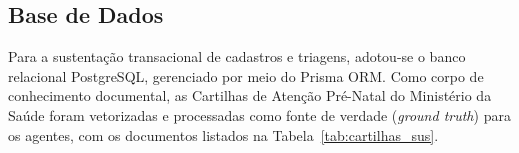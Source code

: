 \documentclass[12pt]{article}
\begin{document}
\subsection{Base de Dados}

Para a sustentação transacional de cadastros e triagens, adotou-se o banco relacional PostgreSQL, gerenciado por meio do Prisma ORM.
Como corpo de conhecimento documental, as Cartilhas de Atenção Pré-Natal do Ministério da Saúde foram vetorizadas e processadas como fonte de verdade (\textit{ground truth}) para os agentes, com os documentos listados na Tabela~\ref{tab:cartilhas_sus}.

\end{document}
